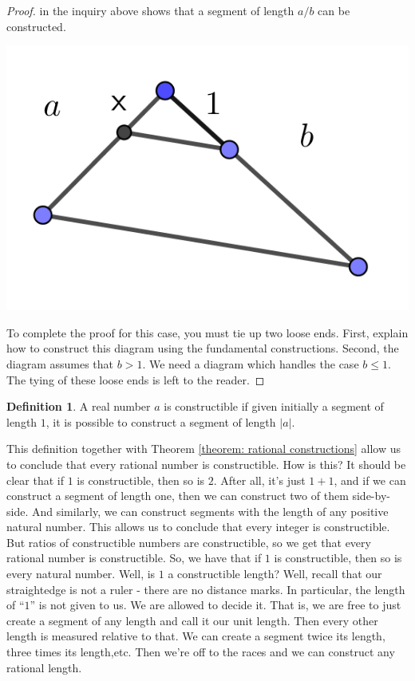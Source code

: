 \documentclass[11pt]{article}
\theoremstyle{definition}
\newtheorem{definition}[theorem]{Definition}
\begin{document}
\begin{proof}
  in the inquiry above shows that a segment of length $a/b$ can be constructed.
  \begin{center}
    \includegraphics[scale=1]{Images/a_over_b.png}
  \end{center}
  To complete the proof for this case, you must tie up two loose ends. First, explain how to construct this diagram using the fundamental
  constructions. Second, the diagram assumes that $b>1$. We need a diagram which handles the case $b \leq 1$. The tying of these loose ends
  is left to the reader.
\end{proof}

\begin{definition}
  A real number $a$ is constructible if given initially a segment of length $1$, it is possible to construct a segment of length $|a|$.
\end{definition}

This definition together with Theorem \ref{theorem: rational constructions} allow us to conclude that every rational number is constructible. How is this?
It should be clear that if $1$ is constructible, then so is $2$. After all, it's just $1+1$, and if we can construct a segment of length one, then
we can construct two of them side-by-side. And similarly, we can construct segments with the length of any positive natural number. This allows us
to conclude that every integer is constructible. But ratios of constructible numbers are constructible, so we get that every rational number is 
constructible. So, we have that if $1$ is constructible, then so is every natural number. Well, is $1$ a constructible length? Well, recall that our
straightedge is not a ruler - there are no distance marks. In particular, the length of ``$1$'' is not given to us. We are allowed to decide it. That is,
we are free to just create a segment of any length and call it our unit length. Then every other length is measured relative to that. We can create
a segment twice its length, three times its length,etc. Then we're off to the races and we can construct any rational length.
\end{document}
